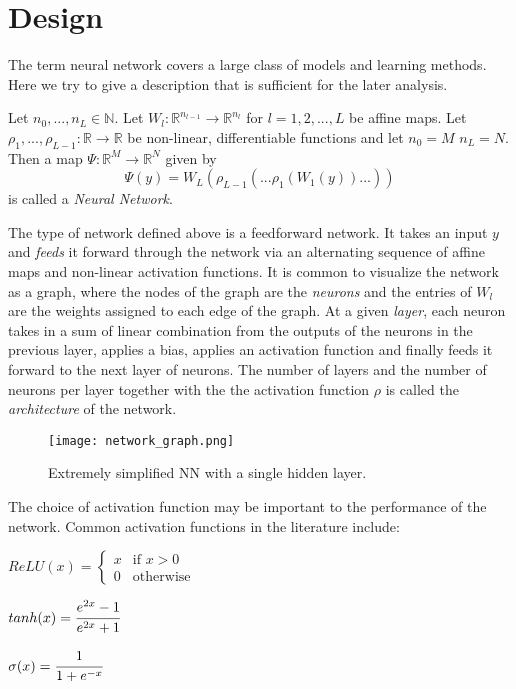 \section{Design}
The term neural network covers a large class of models and learning methods. Here we try to give a description that is sufficient for the later analysis.



\begin{tcolorbox}[colback=blue,colframe=white]
\begin{definition}
Let $n_0,...,n_L \in \mathbb{N}$. Let $W_l : \mathbb{R}^{n_{l-1}} \rightarrow \mathbb{R}^{n_l}$ for $l = 1,2,...,L$ be affine maps. Let $\rho_1,...,\rho_{L-1} : \mathbb{R}\rightarrow  \mathbb{R}$ be non-linear, differentiable functions and let $n_0=M$  $n_L=N$. Then a map $\Psi : \mathbb{R}^{M}\rightarrow  \mathbb{R}^{N}$ given by
\begin{equation*}
\Psi(y) = W_{L}(\rho_{L-1}(...\rho_{1}(W_{1}(y))...))
\end{equation*}
is called a \emph{Neural Network}.
\end{definition}
\end{tcolorbox}


The type of network defined above is a feedforward network. It takes an input $y$ and \emph{feeds} it forward through the network via an alternating sequence of affine maps and non-linear activation functions. It is common to visualize the network as a graph, where the nodes of the graph are the \emph{neurons} and the entries of $W_l$ are the weights assigned to each edge of the graph. At a given \emph{layer}, each neuron takes in a sum of linear combination from the outputs of the neurons in the previous layer, applies a bias, applies an activation function and finally feeds it forward to the next layer of neurons.  
The number of layers and the number of neurons per layer together with the the activation function $\rho$ is called the \emph{architecture} of the network. 

\begin{figure}
\centerline{\texttt{[image: network\_graph.png]}}
\caption{Extremely simplified NN with a single hidden layer.}
\end{figure}


The choice of activation function may be important to the performance of the network. Common activation functions in the literature include: 

\begin{center}
\begin{math}
  ReLU(x)=\begin{cases}
    x & \text{if $x>0$}\\
    0 & \text{otherwise}
  \end{cases} 
\end{math}

\begin{math}
  tanh(x)=\cfrac{e^{2x}-1}{e^{2x}+1}
\end{math}

\begin{math}
   \sigma(x)=\cfrac{1}{1+e^{-x}}
\end{math}
\end{center}

